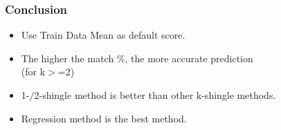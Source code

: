 \documentclass[11pt]{beamer}
\begin{document}
\begin{frame}
\frametitle{Conclusion}

	\begin{itemize}
		[square]
		\item Use Train Data Mean as default score.
		\item The higher the match \%, the more accurate prediction \\ 
		(for k\(>\)=2)
		\item 1-\(/\)2-shingle method is better than other k-shingle methods.
		\item Regression method is the best method.
	\end{itemize}
\end{frame}
\end{document}
